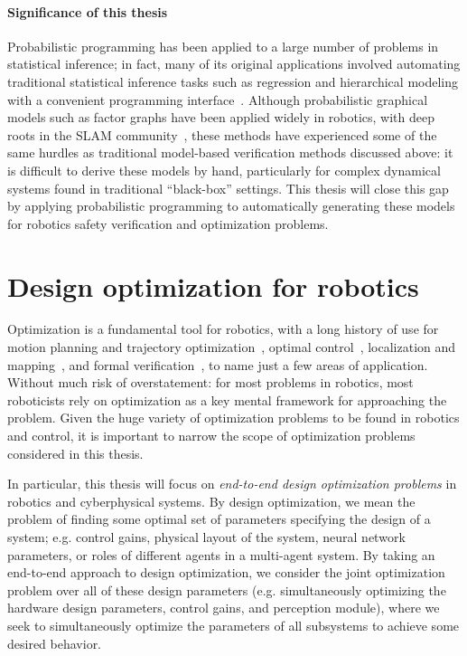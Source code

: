 \paragraph{Significance of this thesis} Probabilistic programming has been applied to a large number of problems in statistical inference; in fact, many of its original applications involved automating traditional statistical inference tasks such as regression and hierarchical modeling with a convenient programming interface~\cite{cusumano-townerGenGeneralpurposeProbabilistic2019}. Although probabilistic graphical models such as factor graphs have been applied widely in robotics, with deep roots in the SLAM community~\cite{dellaertFactorGraphsExploiting2021}, these methods have experienced some of the same hurdles as traditional model-based verification methods discussed above: it is difficult to derive these models by hand, particularly for complex dynamical systems found in traditional ``black-box'' settings. This thesis will close this gap by applying probabilistic programming to automatically generating these models for robotics safety verification and optimization problems.

\section{Design optimization for robotics}

Optimization is a fundamental tool for robotics, with a long history of use for motion planning and trajectory optimization~\cite{schulmanMotionPlanningSequential2014}, optimal control~\cite{liberzonCalculusVariationsOptimal2012}, localization and mapping~\cite{dellaertFactorGraphsExploiting2021}, and formal verification~\cite{liuAlgorithmsVerifyingDeep2021}, to name just a few areas of application. Without much risk of overstatement: for most problems in robotics, most roboticists rely on optimization as a key mental framework for approaching the problem. Given the huge variety of optimization problems to be found in robotics and control, it is important to narrow the scope of optimization problems considered in this thesis.

In particular, this thesis will focus on \textit{end-to-end design optimization problems} in robotics and cyberphysical systems. By design optimization, we mean the problem of finding some optimal set of parameters specifying the design of a system; e.g. control gains, physical layout of the system, neural network parameters, or roles of different agents in a multi-agent system. By taking an end-to-end approach to design optimization, we consider the joint optimization problem over all of these design parameters (e.g. simultaneously optimizing the hardware design parameters, control gains, and perception module), where we seek to simultaneously optimize the parameters of all subsystems to achieve some desired behavior.

